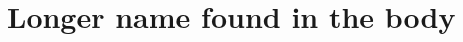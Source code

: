\documentclass[letterpaper,12pt,titlepage,oneside,final]{book}
\let\origdoublepage\cleardoublepage
\newcommand{\clearemptydoublepage}{%
  \clearpage{\pagestyle{empty}\origdoublepage}}
\let\cleardoublepage\clearemptydoublepage
\begin{document}
\chapter[Name in Contents]{Longer name found in the body}
\label{AppendixA}




\cleardoublepage %
\renewcommand*{\bibname}{References}




\nocite{*}
\end{document}
